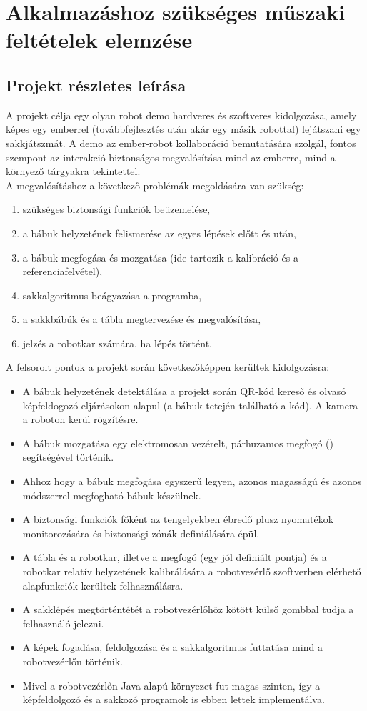 \documentclass[../documentation.tex]{subfiles}
\begin{document}
\section{Alkalmazáshoz szükséges műszaki feltételek elemzése}
\subsection{Projekt részletes leírása}
A projekt célja egy olyan robot demo hardveres és szoftveres kidolgozása, amely képes egy emberrel (továbbfejlesztés után akár egy másik robottal) lejátszani egy sakkjátszmát. A demo az ember-robot kollaboráció bemutatására szolgál, fontos szempont az interakció biztonságos megvalósítása mind az emberre, mind a környező tárgyakra tekintettel.\\

A megvalósításhoz a következő problémák megoldására van szükség:
\begin{enumerate}
	\item szükséges biztonsági funkciók beüzemelése,
	\item a bábuk helyzetének felismerése az egyes lépések előtt és után,
	\item a bábuk megfogása és mozgatása (ide tartozik a kalibráció és a referenciafelvétel),
	\item sakkalgoritmus beágyazása a programba,
	\item a sakkbábúk és a tábla megtervezése és megvalósítása,
	\item jelzés a robotkar számára, ha lépés történt.
\end{enumerate}
A felsorolt pontok a projekt során következőképpen kerültek kidolgozásra:
\begin{itemize}
	\item A bábuk helyzetének detektálása a projekt során QR-kód kereső és olvasó képfeldogozó eljárásokon alapul (a bábuk tetején található a kód). A kamera a roboton kerül rögzítésre.
	\item A bábuk mozgatása egy elektromosan vezérelt, párhuzamos megfogó () segítségével történik.
	\item Ahhoz hogy a bábuk megfogása egyszerű legyen, azonos magasságú és azonos módszerrel megfogható bábuk készülnek.
	\item A biztonsági funkciók főként az tengelyekben ébredő plusz nyomatékok monitorozására és biztonsági zónák definiálására épül.
	\item A tábla és a robotkar, illetve a megfogó (egy jól definiált pontja) és a robotkar relatív helyzetének kalibrálására a robotvezérlő szoftverben elérhető alapfunkciók kerültek felhasználásra.
	\item A sakklépés megtörténtétét a robotvezérlőhöz kötött külső gombbal tudja a felhasználó jelezni.
	\item A képek fogadása, feldolgozása és a sakkalgoritmus futtatása mind a robotvezérlőn történik.
	\item Mivel a robotvezérlőn Java alapú környezet fut magas szinten, így a képfeldolgozó és a sakkozó programok is ebben lettek implementálva.
\end{itemize}
\end{document}
